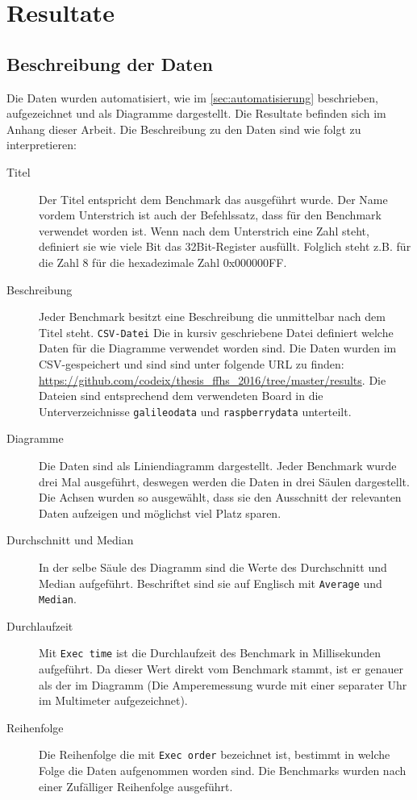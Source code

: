 \chapter{Resultate}

\section{Beschreibung der Daten}

Die Daten wurden automatisiert, wie im \autoref{sec:automatisierung} beschrieben, aufgezeichnet und als Diagramme dargestellt. Die Resultate befinden sich im Anhang dieser Arbeit. Die Beschreibung zu den Daten sind wie folgt zu interpretieren:

\begin{description}
\item[Titel]
Der Titel entspricht dem Benchmark das ausgeführt wurde. Der Name vordem Unterstrich ist auch der Befehlssatz, dass für den Benchmark verwendet worden ist. Wenn nach dem Unterstrich eine Zahl steht, definiert sie wie viele Bit das 32Bit-Register ausfüllt. Folglich steht z.B. für die Zahl 8 für die hexadezimale Zahl 0x000000FF.
\item[Beschreibung]
Jeder Benchmark besitzt eine Beschreibung die unmittelbar nach dem Titel steht.
\texttt{CSV-Datei} Die in kursiv geschriebene Datei definiert welche Daten für die Diagramme verwendet worden sind. Die Daten wurden im CSV-gespeichert und sind sind unter folgende URL zu finden: \url{https://github.com/codeix/thesis_ffhs_2016/tree/master/results}. Die Dateien sind entsprechend dem verwendeten Board in die Unterverzeichnisse \texttt{galileodata} und \texttt{raspberrydata} unterteilt. 
\item[Diagramme]
Die Daten sind als Liniendiagramm dargestellt. Jeder Benchmark wurde drei Mal ausgeführt, deswegen werden die Daten in drei Säulen dargestellt. Die Achsen wurden so ausgewählt, dass sie den Ausschnitt der relevanten Daten aufzeigen und möglichst viel Platz sparen.
\item[Durchschnitt und Median]
In der selbe Säule des Diagramm sind die Werte des Durchschnitt und Median aufgeführt. Beschriftet sind sie auf Englisch mit \texttt{Average} und \texttt{Median}.
\item[Durchlaufzeit]
Mit \texttt{Exec time} ist die Durchlaufzeit des Benchmark in Millisekunden aufgeführt. Da dieser Wert direkt vom Benchmark stammt, ist er genauer als der im Diagramm (Die Amperemessung wurde mit einer separater Uhr im Multimeter aufgezeichnet).
\item[Reihenfolge] Die Reihenfolge die mit \texttt{Exec order} bezeichnet ist, bestimmt in welche Folge die Daten aufgenommen worden sind. Die Benchmarks wurden nach einer Zufälliger Reihenfolge ausgeführt.


\end{description}